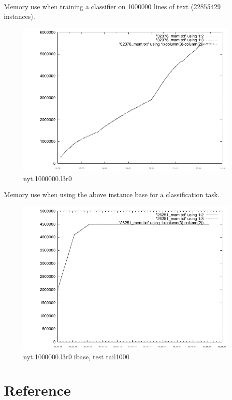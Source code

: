\documentclass[a4paper,10pt,twoside]{report}
\begin{document}
Memory use when training a classifier on \num{1000000} lines of text
(\num{22855429} instances).

\begin{figure}[!ht]
  \centering
  \includegraphics[width=\pdfwidth]{32376_mem.pdf}
 \caption{nyt.1000000.l3r0}
  \label{fig:32376_mem.pdf}
\end{figure}

Memory use when using the above instance base for a classification
task.

\begin{figure}[!ht]
  \centering
  \includegraphics[width=\pdfwidth]{26251_mem.pdf}
 \caption{nyt.1000000.l3r0 ibase, test tail1000}
  \label{fig:26251_mem.pdf}
\end{figure}

\chapter{Reference}
\end{document}
